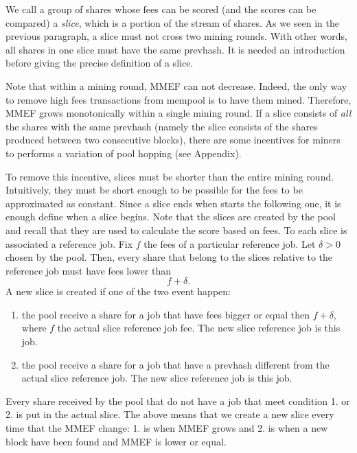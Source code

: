 \documentclass[11pt]{article} %
\begin{document}
We call a group of shares whose fees can be scored (and the scores can be compared) a \emph{slice}, which is a portion of the stream of shares. As we seen in the previous paragraph, a slice must not cross two mining rounds. With other words, all shares in one slice must have the same prevhash. It is needed an introduction before giving the precise definition of a slice.

Note that within a mining round, MMEF can not decrease. Indeed,  the only way to remove high fees transactions from mempool is to have them mined. Therefore, MMEF grows monotonically within a single mining round. If a slice consists of \emph{all} the shares with the same prevhash (namely the slice consists of the shares produced between two consecutive blocks), there are some incentives for miners to performs a variation of pool hopping (see Appendix).

\begin{comment}
In order to pay fairly shares taking in consideration fees, it is appriopriate to compare shares relative to the same round of mining. Indeed, it is difficult to find a tool capable of scoring two shares produced in two moment in which the mempool differs consistently. So, we can only compare shares with the same prevhash.


The above system do not account for the fact that the mempool maximum extractable fees (MMEF) change, and grows monotonically between block n and block n+1. This can be verified empirically, to notethat between 2 block MMEF can not decrease cause the only way to remove high fees transactions
from mempool is to put them in a block. This give an incentive to the miners to do pool hopping (TODO).
\end{comment}

To remove this incentive, slices must be shorter than the entire mining round. Intuitively, they must be short enough to be possible for the fees to be approximated as constant. Since a slice ends when starts the following one, it is enough define when a slice begins. Note that the slices are created by the pool and recall that they are used to calculate the score based on fees. To each slice is associated a reference job. Fix $f$ the fees of a particular reference job. Let $\delta>0$ chosen by the pool. Then, every share that belong to the slices relative to the reference job must have fees lower than
\[ f+\delta.\]
A new slice is created if one of the two event happen:
\begin{enumerate}
	\item the pool receive a share for a job that have fees bigger or equal then $f+\delta$, where $f$ the actual slice reference job fee. The new slice reference job is this job.
	\item the pool receive a share for a job that have a prevhash different from the actual slice reference job. The new slice reference job is this job.
\end{enumerate}
Every share received by the pool that do not have a job that meet condition 1. or 2. is put in the actual slice. The above means that we create a new slice every time that the MMEF change: 1. is when MMEF grows and 2. is when a new block have been found and MMEF is lower or equal.
\end{document}
